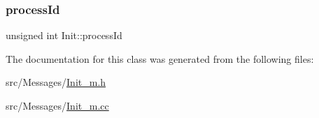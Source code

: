 \subsubsection{\texorpdfstring{process\+Id}{processId}}
{\footnotesize\ttfamily unsigned int Init\+::process\+Id\hspace{0.3cm}{\ttfamily [protected]}}



The documentation for this class was generated from the following files\+:\begin{DoxyCompactItemize}
\item 
src/\+Messages/\hyperlink{_init__m_8h}{Init\+\_\+m.\+h}\item 
src/\+Messages/\hyperlink{_init__m_8cc}{Init\+\_\+m.\+cc}\end{DoxyCompactItemize}
